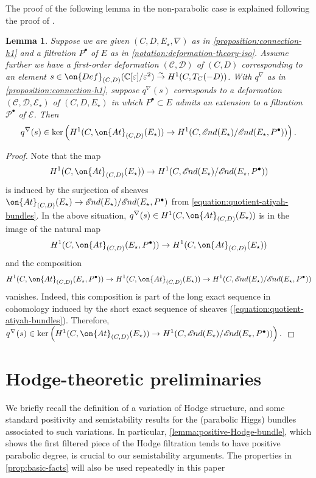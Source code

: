 \documentclass[12 pt]{amsart}
\theoremstyle{plain}
\newtheorem{lemma}[subsubsection]{Lemma}
\theoremstyle{definition}
\theoremstyle{remark}
\numberwithin{equation}{section}
\newcommand*{\sheafend}{\mathscr{E}\kern -1pt nd}
\begin{document}
The proof of the following lemma in the non-parabolic case is explained following the proof of 
\cite[Lemma 3.1]{BHH:logarithmic}.

\begin{lemma}
	\label{lemma:parabolic-extension-obstruction}
	Suppose we are given $(C,D,E_\star,\nabla)$ as in
	\autoref{proposition:connection-h1}
	and a filtration $P^\bullet$ of $E$ as in
	\autoref{notation:deformation-theory-iso}.
	Assume
	further we have a first-order deformation $(\mathscr C, \mathscr D)$ of $(C, D)$
	corresponding to an element $s \in \on{Def}_{(C,D)}(\mathbb{C}[\varepsilon]/\varepsilon^2)\overset{\sim}{\to} H^1(C, T_C(-D))$.
	With $q^\nabla$ as in 
	\autoref{proposition:connection-h1},
	suppose $q^\nabla(s)$
	corresponds to a deformation $(\mathscr C, \mathscr D, \mathscr E_\star)$ of
	$(C,D,E_\star)$
in which $P^\bullet \subset E$ admits an extension to a filtration $\mathscr
P^\bullet$
of $\mathscr E$.
Then $$q^\nabla(s) \in \ker
\left(H^1(C, \on{At}_{(C,D)}(E_\star)) \to H^1(C,
\sheafend(E_\star)/\sheafend(E_\star, P^\bullet))\right).$$
\end{lemma}
\begin{proof}
	Note that the map
	$$H^1(C, \on{At}_{(C,D)}(E_\star)) \to
	H^1(C,\sheafend(E_\star)/\sheafend(E_\star, P^\bullet))$$
is induced by the surjection of sheaves
$\on{At}_{(C,D)}(E_\star)
\to \sheafend(E_\star)/\sheafend(E_\star, P^\bullet)$
from \eqref{equation:quotient-atiyah-bundles}.
In the above situation,
	$q^\nabla(s) \in H^1(C, \on{At}_{(C,D)}(E_\star))$ is in the image of the natural map
	$$H^1(C, \on{At}_{(C,D)}(E_\star, P^\bullet))\to H^1(C,
	\on{At}_{(C,D)}(E_\star))$$ and the composition
	$$H^1(C, \on{At}_{(C,D)}(E_\star, P^\bullet)) \to H^1(C,
	\on{At}_{(C,D)}(E_\star)) \to H^1(C,
\sheafend(E_\star)/\sheafend(E_\star, P^\bullet))$$
vanishes. Indeed, this composition is part of the long exact sequence in cohomology induced by the short exact
sequence of sheaves (\ref{equation:quotient-atiyah-bundles}).
Therefore, 
$q^\nabla(s) \in \ker
\left(H^1(C, \on{At}_{(C,D)}(E_\star)) \to H^1(C,
\sheafend(E_\star)/\sheafend(E_\star, P^\bullet))\right).$
\end{proof}

\section{Hodge-theoretic preliminaries}\label{section:hodge-theoretic-preliminaries}

We briefly recall the definition of a variation of Hodge structure, and some standard positivity and semistability results for the (parabolic Higgs) bundles associated to such variations.
In particular, \autoref{lemma:positive-Hodge-bundle}, which shows the first
filtered piece of the Hodge filtration tends to have positive parabolic degree, is crucial
to our semistability arguments.
The properties in \autoref{prop:basic-facts} will also be used repeatedly in this
paper
\end{document}
